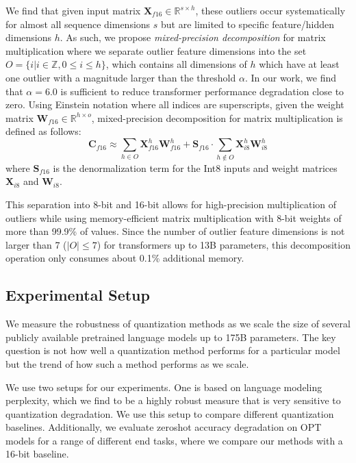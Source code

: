 \documentclass{article}
\begin{document}
We find that given input matrix $\mathbf{X}_{f16}\in \mathbb{R}^{s\times h}$, these outliers occur systematically for almost all sequence dimensions $s$ but are limited to specific feature/hidden dimensions $h$. As such, we propose {\it mixed-precision decomposition} for matrix multiplication where we separate outlier feature dimensions into the set ${O =\{i| i\in \mathbb{Z}, 0 \leq i \leq h\}}$, which contains all dimensions of $h$ which have at least one outlier with a magnitude larger than the threshold $\alpha$. In our work, we find that $\alpha=6.0$ is sufficient to reduce transformer performance degradation close to zero. Using Einstein notation where all indices are superscripts, given the weight matrix $\mathbf{W}_{f16}\in \mathbb{R}^{h\times o}$, mixed-precision decomposition for matrix multiplication is defined as follows:
\begin{equation}
    \mathbf{C}_{f16} \approx \sum\limits_{h\in O} \mathbf{X}_{f16}^h \mathbf{W}_{f16}^h + \mathbf{S}_{f16} \cdot  \sum\limits_{h\not\in O} \mathbf{X}_{i8}^h \mathbf{W}_{i8}^h
\end{equation}
where $\mathbf{S}_{f16}$ is the denormalization term for the Int8 inputs and weight matrices $\mathbf{X}_{i8}$ and $\mathbf{W}_{i8}$.

This separation into 8-bit and 16-bit allows for high-precision multiplication of outliers while using memory-efficient matrix multiplication with 8-bit weights of more than 99.9\% of values. Since the number of outlier feature dimensions is not larger than 7 ($|O|\leq7$) for transformers up to 13B parameters, this decomposition operation only consumes about 0.1\% additional memory.

\subsection{Experimental Setup}

We measure the robustness of quantization methods as we scale the size of several publicly available pretrained language models up to 175B parameters. The key question is not how well a quantization method performs for a particular model but the trend of how such a method performs as we scale.

We use two setups for our experiments. One is based on language modeling perplexity, which we find to be a highly robust measure that is very sensitive to quantization degradation. We use this setup to compare different quantization baselines. Additionally, we evaluate zeroshot accuracy degradation on OPT models for a range of different end tasks, where we compare our methods with a 16-bit baseline.
\end{document}
